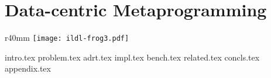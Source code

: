 \chapter{Data-centric Metaprogramming}
\label{chapter:ildl}

\begin{wrapfigure}{r}{40mm}
  \centering
  \vspace{-27em}
  \texttt{[image: ildl-frog3.pdf]}
  \vspace{-27em}
\end{wrapfigure}

{intro.tex}
{problem.tex}
{adrt.tex}
{impl.tex}
{bench.tex}
{related.tex}
{concls.tex}
\newpage
{appendix.tex}

